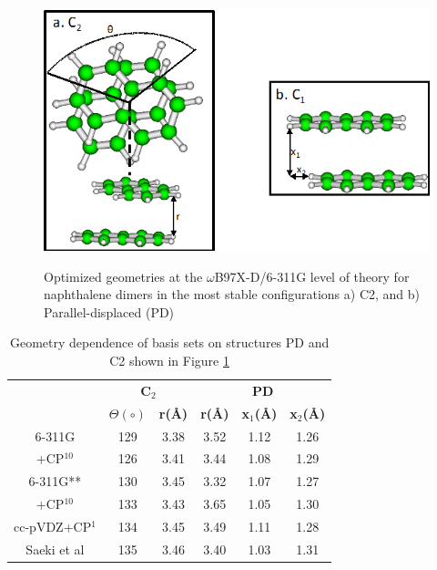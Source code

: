 \begin{figure}[h]
	\centering
	\includegraphics[scale=0.7]{image/napthalene-dimer} \label{fig5d}
	\caption[Optimized geometries for naphthalene dimers]{Optimized geometries at the $\omega$B97X-D/6-311G level of theory for naphthalene dimers in the most stable configurations a) C2, and b) Parallel-displaced (PD)}
\end{figure}


\begin{table}[htb]
	\caption{Geometry dependence of basis sets on structures PD and C2 shown in Figure \ref{fig5d}}
	\begin{center}
		\begin{tabular}{c c c c c c}
			\toprule
			 & \multicolumn{2}{p{4cm}}{\centering \textbf{C$_{2}$}} & \multicolumn{3}{p{6cm}}{\centering \textbf{PD}}\\
			  & \textbf{$\Theta(\circ)$} & \textbf{r(\AA)} & \textbf{r(\AA)} & \textbf{x$_{1}$(\AA)} & \textbf{x$_{2}$(\AA)}\\
			  \midrule
			  6-311G & 129 & 3.38 & 3.52 & 1.12 & 1.26\\
			  +CP$^{10}$ & 126  & 3.41 & 3.44 & 1.08 & 1.29\\	  
			  6-311G** & 130 & 3.45 & 3.32 & 1.07 & 1.27\\
			  +CP$^{10}$ & 133 & 3.43 & 3.65 & 1.05 & 1.30\\
			  cc-pVDZ+CP$^{1}$ & 134 & 3.45 & 3.49 & 1.11 & 1.28\\
			  Saeki et al\cite{saeki2006theoretical} & 135 & 3.46 & 3.40 & 1.03 &  1.31\\
			  \bottomrule
		\end{tabular}
	\end{center}
\end{table}



